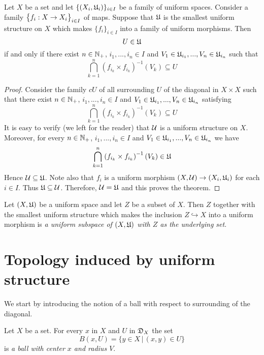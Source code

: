 \begin{theorem}\label{theorem:description_of_uniform_structure_introduced_by_a_family_of_maps}
Let $X$ be a set and let $\{(X_i,{\mathfrak U}_i)\}_{i\in I}$ be a family of uniform spaces. Consider a family $\big\{f_i:X\rightarrow X_i\big\}_{i\in I}$ of maps. Suppose that ${\mathfrak U}$ is the smallest uniform structure on $X$ which makes $\{f_i\}_{i\in I}$ into a family of uniform morphisms. Then 
$$U \in {\mathfrak U}$$
if and only if there exist $n\in {\mathbb N}_+$, $i_1,...,i_n\in I$ and $V_1 \in {\mathfrak U}_{i_1},...,V_n\in {\mathfrak U}_{i_n}$ such that
$$\bigcap_{k=1}^n\left(f_{i_k}\times f_{i_k}\right)^{-1}(V_k) \subseteq U$$
\end{theorem}
\begin{proof}
Consider the family $cU$ of all surrounding $U$ of the diagonal in $X\times X$ such that there exist $n\in {\mathbb N}_+$, $i_1,...,i_n\in I$ and $V_1 \in {\mathfrak U}_{i_1},...,V_n\in {\mathfrak U}_{i_n}$ satisfying
$$\bigcap_{k=1}^n\left(f_{i_k}\times f_{i_k}\right)^{-1}(V_k) \subseteq U$$
It is easy to verify (we left for the reader) that ${\mathcal U}$ is a uniform structure on $X$. Moreover, for every $n\in {\mathbb N}_+$, $i_1,...,i_n\in I$ and $V_1 \in {\mathfrak U}_{i_1},...,V_n\in {\mathfrak U}_{i_n}$ we have
$$\bigcap_{k=1}^n\left(f_{i_k}\times f_{i_k}\right)^{-1}(V_k) \in {\mathfrak U}$$
Hence ${\mathcal U} \subseteq {\mathfrak U}$. Note also that $f_i$ is a uniform morphism $(X,{\mathcal U})\rightarrow (X_i,{\mathfrak U}_i)$ for each $i\in I$. Thus ${\mathfrak U} \subseteq {\mathcal U}$. Therefore, ${\mathcal U} = {\mathfrak U}$ and this proves the theorem. 
\end{proof}

\begin{definition}
Let $(X,{\mathfrak U})$ be a uniform space and let $Z$ be a subset of $X$. Then $Z$ together with the smallest uniform structure which makes the inclusion $Z\hookrightarrow X$ into a uniform morphism is \textit{a uniform subspace of $(X,{\mathfrak U})$ with $Z$ as the underlying set}.
\end{definition}

\section{Topology induced by uniform structure}
\noindent
We start by introducing the notion of a ball with respect to surrounding of the diagonal.

\begin{definition}
Let $X$ be a set. For every $x$ in $X$ and $U$ in ${\mathfrak D}_X$ the set
$$B(x,U) = \big\{y\in X\,\big|\,(x,y)\in U\big\}$$
is \textit{a ball with center $x$ and radius $V$}.
\end{definition}

